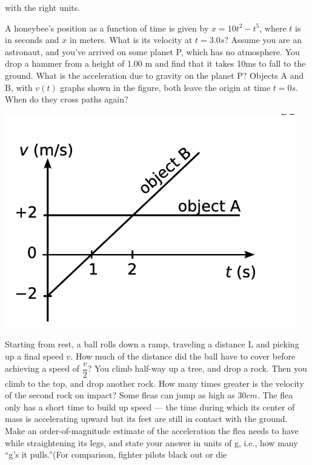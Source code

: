 \documentclass[12pt,addpoints]{exam}
\begin{document}
\begin{center}
\begin{questions}
\begin{enumerate}[label=(\alph*)]
				with the right units.\vspace{1in}
			\end{enumerate} 
			\question A honeybee’s position as a function of time is given by $x = 10t^2-t^5$, where $t$ is in seconds and $x$ in meters. What is its velocity at $t = 3.0s$?\vspace{1in}
			\question Assume you are an astronaut, and you’ve arrived on some planet P, which has no atmosphere. You drop a hammer from a height of 1.00 m and find that it takes 10ms to fall to the ground. What is the acceleration due to gravity on the planet P?\vspace{1.5in}
			\question Objects A and B, with $v(t)$ graphs shown in the figure, both leave the origin at time $t = 0 s$. When do they cross paths again?
			\begin{center}
				\includegraphics[scale=0.3]{graph2.png}
			\end{center}\vspace{1in}
			\question Starting from rest, a ball rolls down a ramp, traveling a distance L and picking up a final speed $v$. How much of the distance did the ball have to cover before achieving a speed of $\dfrac{v}{2}$?\vspace{1in}
			\question You climb half-way up a tree, and drop a rock. Then you climb to the top, and drop another rock. How many times greater is the velocity of the second rock on impact?\vspace{1in}
			\question Some fleas can jump as high as $30 cm$. The flea only has a short time to build up speed — the time during which its center of mass is accelerating upward but its feet are still in contact with the ground. Make an order-of-magnitude estimate of the acceleration the flea needs to have while straightening its legs, and state your answer in units of g, i.e., how many “g’s it pulls.”(For comparison, fighter pilots black out or die

\end{questions}
\end{center}
\end{document}
